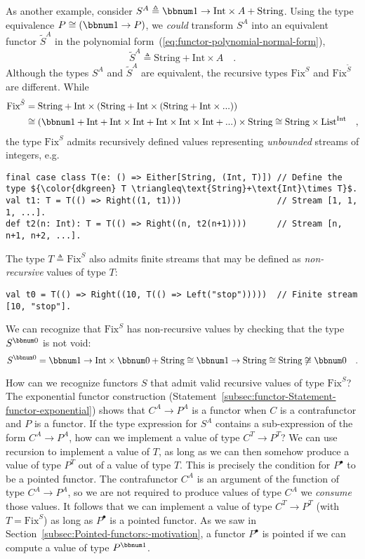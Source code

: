 As another example, consider $S^{A}\triangleq\bbnum 1\rightarrow\text{Int}\times A+\text{String}$.
Using the type equivalence $P\cong(\bbnum 1\rightarrow P)$, we \emph{could}
transform $S^{A}$ into an equivalent functor $\tilde{S}^{A}$ in
the polynomial form~(\ref{eq:functor-polynomial-normal-form}),
\[
\tilde{S}^{A}\triangleq\text{String}+\text{Int}\times A\quad.
\]
Although the types $S^{A}$ and $\tilde{S}^{A}$ are equivalent, the
recursive types $\text{Fix}^{S}$ and $\text{Fix}^{\tilde{S}}$ are
different. While 
\begin{align*}
\text{Fix}^{\tilde{S}} & =\text{String}+\text{Int}\times(\text{String}+\text{Int}\times(\text{String}+\text{Int}\times...))\\
 & \cong\left(\bbnum 1+\text{Int}+\text{Int}\times\text{Int}+\text{Int}\times\text{Int}\times\text{Int}+...\right)\times\text{String}\cong\text{String}\times\text{List}^{\text{Int}}\quad,
\end{align*}
the type $\text{Fix}^{S}$ admits recursively defined values representing
\emph{unbounded} streams of integers, e.g.
\begin{lstlisting}[mathescape=true]
final case class T(e: () => Either[String, (Int, T)]) // Define the type ${\color{dkgreen} T \triangleq\text{String}+\text{Int}\times T}$.
val t1: T = T(() => Right((1, t1)))                   // Stream [1, 1, 1, ...].
def t2(n: Int): T = T(() => Right((n, t2(n+1))))      // Stream [n, n+1, n+2, ...].
\end{lstlisting}
The type $T\triangleq\text{Fix}^{S}$ also admits finite streams that
may be defined as \emph{non-recursive} values of type $T$:
\begin{lstlisting}
val t0 = T(() => Right((10, T(() => Left("stop")))))  // Finite stream [10, "stop"].
\end{lstlisting}
We can recognize that $\text{Fix}^{S}$ has non-recursive values by
checking that the type $S^{\bbnum 0}$ is not void:
\[
S^{\bbnum 0}=\bbnum 1\rightarrow\text{Int}\times\bbnum 0+\text{String}\cong\bbnum 1\rightarrow\text{String}\cong\text{String}\not\cong\bbnum 0\quad.
\]

How can we recognize functors $S$ that admit valid recursive values
of type $\text{Fix}^{S}$? The exponential functor construction (Statement~\ref{subsec:functor-Statement-functor-exponential})
shows that $C^{A}\rightarrow P^{A}$ is a functor when $C$ is a contrafunctor
and $P$ is a functor. If the type expression for $S^{A}$ contains
a sub-expression of the form $C^{A}\rightarrow P^{A}$, how can we
implement a value of type $C^{T}\rightarrow P^{T}$? We can use recursion
to implement a value of $T$, as long as we can then somehow produce
a value of type $P^{T}$ out of a value of type $T$. This is precisely
the condition for $P^{\bullet}$ to be a pointed functor. The contrafunctor
$C^{A}$ is an argument of the function of type $C^{A}\rightarrow P^{A}$,
so we are not required to produce values of type $C^{A}$\textemdash{}
we \emph{consume} those values. It follows that we can implement a
value of type $C^{T}\rightarrow P^{T}$ (with $T=\text{Fix}^{S}$)
as long as $P^{\bullet}$ is a pointed functor. As we saw in Section~\ref{subsec:Pointed-functors:-motivation},
a functor $P^{\bullet}$ is pointed if we can compute a value of type
$P^{\bbnum 1}$.

